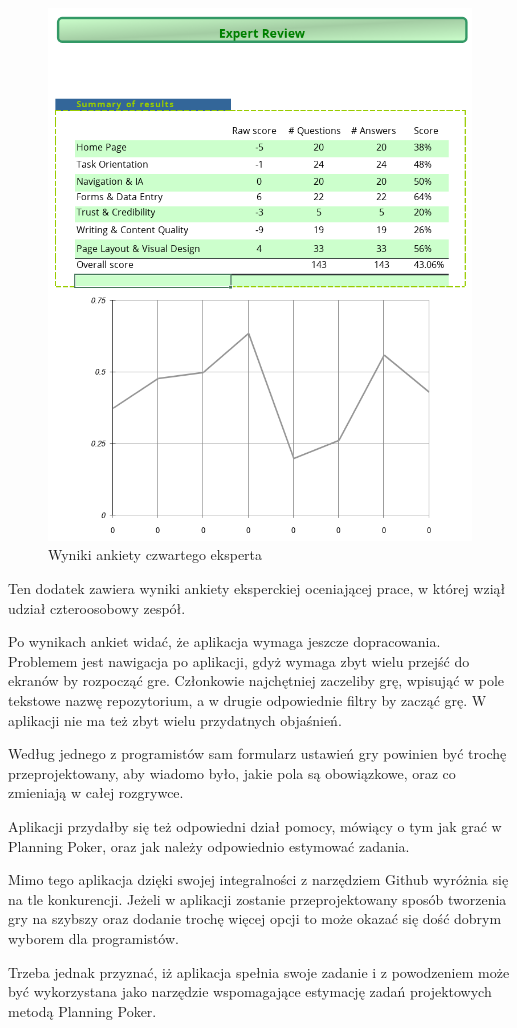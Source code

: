 \documentclass[inzynier,druk]{dyplom}
\begin{document}
\begin{figure}
	\centering\includegraphics[width=\textwidth]{img/ankieta4}
	\caption{Wyniki ankiety czwartego eksperta}\label{rys:ankieta4}%
\end{figure}

Ten dodatek zawiera wyniki ankiety eksperckiej oceniającej prace,
w której wziął udział czteroosobowy zespół.

Po wynikach ankiet widać, że aplikacja wymaga jeszcze dopracowania.
Problemem jest nawigacja po aplikacji, gdyż wymaga zbyt wielu przejść do ekranów by rozpocząć gre.
Członkowie najchętniej zaczeliby grę, wpisująć w pole tekstowe nazwę repozytorium,
a w drugie odpowiednie filtry by zacząć grę. W aplikacji nie ma też zbyt wielu przydatnych objaśnień.

Według jednego z programistów sam formularz ustawień gry powinien być trochę przeprojektowany,
aby wiadomo było, jakie pola są obowiązkowe, oraz co zmieniają w całej rozgrywce.

Aplikacji przydałby się też odpowiedni dział pomocy, mówiący o tym jak grać w Planning Poker,
oraz jak należy odpowiednio estymować zadania.

Mimo tego aplikacja dzięki swojej integralności z narzędziem Github wyróżnia się na tle konkurencji.
Jeżeli w aplikacji zostanie przeprojektowany sposób tworzenia gry na szybszy
oraz dodanie trochę więcej opcji to może okazać się dość dobrym wyborem dla programistów.

Trzeba jednak przyznać, iż aplikacja spełnia swoje zadanie i z powodzeniem może być wykorzystana
jako narzędzie wspomagające estymację zadań projektowych metodą Planning Poker.




\end{document}
